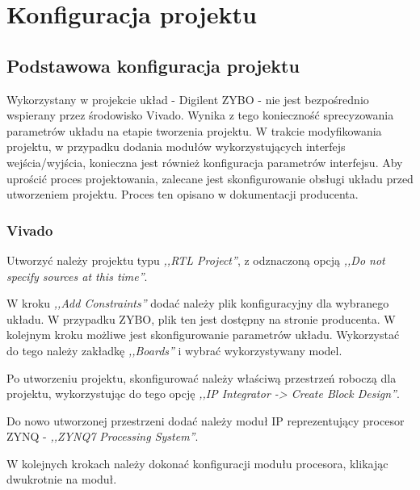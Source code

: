 \section{Konfiguracja projektu}
\label{sec:vivado-conf}

\subsection{Podstawowa konfiguracja projektu}

Wykorzystany w projekcie układ - Digilent ZYBO - nie jest bezpośrednio wspierany przez środowisko Vivado. Wynika z tego konieczność sprecyzowania parametrów układu na etapie tworzenia projektu. W trakcie modyfikowania projektu, w przypadku dodania modułów wykorzystujących interfejs wejścia/wyjścia, konieczna jest również konfiguracja parametrów interfejsu. Aby uprościć proces projektowania, zalecane jest skonfigurowanie obsługi układu przed utworzeniem projektu. Proces ten opisano w dokumentacji producenta. \cite{zybo-in-vivado}

\subsubsection{Vivado}

Utworzyć należy projektu typu \emph{,,RTL Project''}, z odznaczoną opcją \emph{,,Do not specify sources at this time''}.

W kroku \emph{,,Add Constraints''} dodać należy plik konfiguracyjny dla wybranego układu. W przypadku ZYBO, plik ten jest dostępny na stronie producenta. W kolejnym kroku możliwe jest skonfigurowanie parametrów układu. Wykorzystać do tego należy zakładkę \emph{,,Boards''} i wybrać wykorzystywany model.

Po utworzeniu projektu, skonfigurować należy właściwą przestrzeń roboczą dla projektu, wykorzystując do tego opcję \emph{,,IP Integrator -> Create Block Design''}.

Do nowo utworzonej przestrzeni dodać należy moduł IP reprezentujący procesor ZYNQ - \emph{,,ZYNQ7 Processing System''}.

W kolejnych krokach należy dokonać konfiguracji modułu procesora, klikając dwukrotnie na moduł.

